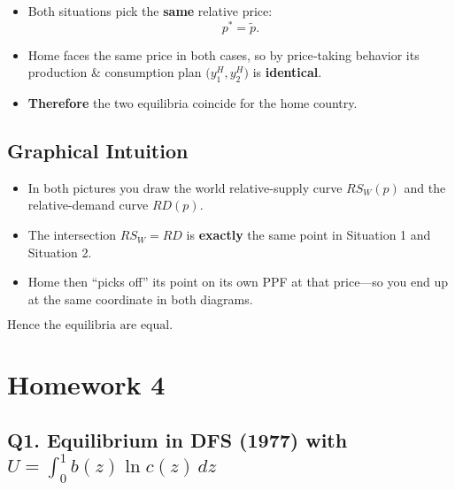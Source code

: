\documentclass[
]{article}
\providecommand{\tightlist}{%
  \setlength{\itemsep}{0pt}\setlength{\parskip}{0pt}}
\begin{document}
\begin{itemize}
\tightlist
\item
  Both situations pick the \textbf{same} relative price:\\
  \[
    p^* = \tilde p.
  \]
\item
  Home faces the same price in both cases, so by price‐taking behavior
  its production \& consumption plan \(\bigl(y_1^H,y_2^H\bigr)\) is
  \textbf{identical}.
\item
  \textbf{Therefore} the two equilibria coincide for the home country.
\end{itemize}

\subsection{Graphical Intuition}\label{graphical-intuition}

\begin{itemize}
\tightlist
\item
  In both pictures you draw the world relative-supply curve \(RS_W(p)\)
  and the relative-demand curve \(RD(p)\).
\item
  The intersection \(RS_W=RD\) is \textbf{exactly} the same point in
  Situation 1 and Situation 2.
\item
  Home then ``picks off'' its point on its own PPF at that price---so
  you end up at the same coordinate in both diagrams.
\end{itemize}

\(\boxed{\text{Hence the equilibria are equal.}}\)

\section{Homework 4}\label{homework-4}

\subsection{\texorpdfstring{Q1. Equilibrium in DFS (1977) with
\(U=\int_{0}^{1}b(z)\ln c(z)\,dz\)}{Q1. Equilibrium in DFS (1977) with U=\textbackslash int\_\{0\}\^{}\{1\}b(z)\textbackslash ln c(z)\textbackslash,dz}}\label{q1.-equilibrium-in-dfs-1977-with-uint_01bzln-czdz}
\end{document}
